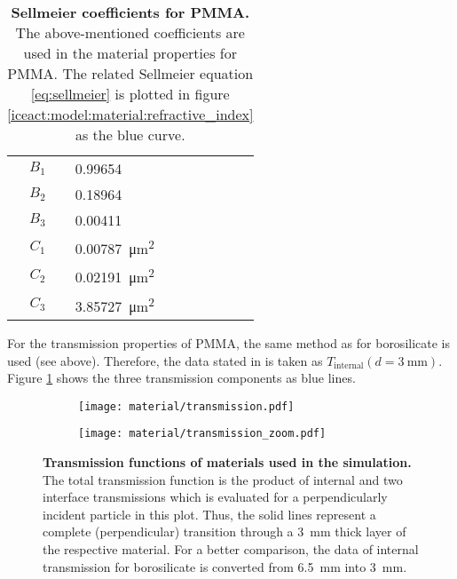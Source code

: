 \begin{table}[H]
	\centering
	\begin{tabular}{c|l}
		$B_1$  & \num{0.99654}  \\
		$B_2$  & \num{0.18964}  \\
		$B_3$  & \num{0.00411}  \\
		$C_1$  & \SI{0.00787}{\micro\meter\squared}  \\
		$C_2$  & \SI{0.02191}{\micro\meter\squared}  \\
		$C_3$  & \SI{3.85727}{\micro\meter\squared}  \\
	\end{tabular}
	\caption[Sellmeier coefficients for PMMA]{\textbf{Sellmeier coefficients for PMMA.} \cite{iceact:refractiveindex} The above-mentioned coefficients are used in the \geant material properties for PMMA. The related Sellmeier equation \eqref{eq:sellmeier} is plotted in figure \ref{iceact:model:material:refractive_index} as the blue curve.}
	\label{iceact:model:pmma_sellmeiercoeffs}
\end{table}

For the transmission properties of PMMA, the same method as for borosilicate is used (see above). Therefore, the data stated in \cite{famous:niggemann} is taken as $T_\text{internal}(d = \SI{3}{\milli\meter})$. Figure \ref{iceact:model:material:transmission} shows the three transmission components as blue lines.

\begin{figure}[H]
	\centering
	\begin{subfigure}[t]{0.485\textwidth}
		\texttt{[image: material/transmission.pdf]}
	\end{subfigure}
	\hfill
	\begin{subfigure}[t]{0.499\textwidth}
		\texttt{[image: material/transmission\_zoom.pdf]}
	\end{subfigure}
	\caption[Transmission of used materials]{\textbf{Transmission functions of materials used in the simulation.} The total transmission function is the product of internal and two interface transmissions which is evaluated for a perpendicularly incident particle in this plot. Thus, the solid lines represent a complete (perpendicular) transition through a \SI{3}{\milli\meter} thick layer of the respective material. For a better comparison, the data of internal transmission for borosilicate is converted from \SI{6.5}{\milli\meter} into \SI{3}{\milli\meter}.}
	\label{iceact:model:material:transmission}	
\end{figure}

